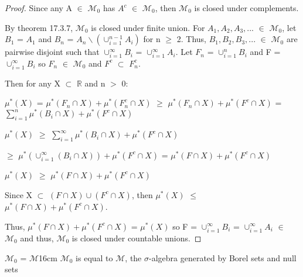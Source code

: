     \begin{proof}
        Since any A $\in$ $\mathcal{M}_0$ has $A^c$ $\in$ $\mathcal{M}_0$,
        then $\mathcal{M}_0$ is closed under complements.

        By {\color{red} theorem 17.3.7}, $\mathcal{M}_0$ is closed under finite
        union.
        For $A_1,A_2,A_3,...$ $\in$ $\mathcal{M}_0$,
        let $B_1$ = $A_1$ and $B_n$ = $A_n \backslash (\cup_{i=1}^{n-1} A_i)$
        for n $\geq$ 2. Thus, $B_1,B_2,B_3,...$ $\in$ $\mathcal{M}_0$ are
        pairwise disjoint such that $\cup_{i=1}^{\infty} B_i$
        = $\cup_{i=1}^{\infty} A_i$.
        Let $F_n$ = $\cup_{i=1}^n B_i$ and F = $\cup_{i=1}^{\infty} B_i$
        so $F_n$ $\in$ $\mathcal{M}_0$ and $F^c$ $\subset$ $F_n^c$.

        Then for any X $\subset$ $\mathbb{R}$ and n $>$ 0:

        \hspace{0.5cm}
        $\mu^*(X)$
        = $\mu^*(F_n \cap X) + \mu^*(F_n^c \cap X)$
        $\geq$ $\mu^*(F_n \cap X) + \mu^*(F^c \cap X)$
        = $\sum_{i=1}^n \mu^*(B_i \cap X) + \mu^*(F^c \cap X)$

        \hspace{0.5cm}
        $\mu^*(X)$
        $\geq$ $\sum_{i=1}^{\infty} \mu^*(B_i \cap X) + \mu^*(F^c \cap X)$
        
        \hspace{1.7cm}
        $\geq$ $\mu^*(\cup_{i=1}^{\infty} (B_i \cap X)) + \mu^*(F^c \cap X)$
        = $\mu^*(F \cap X) + \mu^*(F^c \cap X)$

        \hspace{0.5cm}
        $\mu^*(X)$ $\geq$ $\mu^*(F \cap X) + \mu^*(F^c \cap X)$

        Since X $\subset$ $(F \cap X) \cup (F^c \cap X)$, then
        $\mu^*(X)$ $\leq$ $\mu^*(F \cap X) + \mu^*(F^c \cap X)$.

        Thus, $\mu^*(F \cap X) + \mu^*(F^c \cap X)$
        = $\mu^*(X)$ so F = $\cup_{i=1}^{\infty} B_i$
        = $\cup_{i=1}^{\infty} A_i$ $\in$ $\mathcal{M}_0$
        and thus, $\mathcal{M}_0$ is closed under countable unions.
    \end{proof}

    \vspace{0.5cm}



    \begin{wtheorem}{$\mathcal{M}_0$ = $\mathcal{M}$}{16cm}
        $\mathcal{M}_0$ is equal to $\mathcal{M}$, the $\sigma$-algebra
        generated by Borel sets and null sets
    \end{wtheorem}

